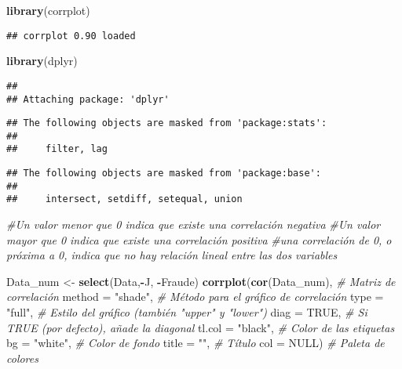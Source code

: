 \documentclass[]{article}
\newenvironment{Shaded}{\begin{snugshade}}{\end{snugshade}}
\newcommand{\CommentTok}[1]{\textcolor[rgb]{0.56,0.35,0.01}{\textit{#1}}}
\newcommand{\DataTypeTok}[1]{\textcolor[rgb]{0.13,0.29,0.53}{#1}}
\newcommand{\KeywordTok}[1]{\textcolor[rgb]{0.13,0.29,0.53}{\textbf{#1}}}
\newcommand{\NormalTok}[1]{#1}
\newcommand{\OperatorTok}[1]{\textcolor[rgb]{0.81,0.36,0.00}{\textbf{#1}}}
\newcommand{\OtherTok}[1]{\textcolor[rgb]{0.56,0.35,0.01}{#1}}
\newcommand{\StringTok}[1]{\textcolor[rgb]{0.31,0.60,0.02}{#1}}
\begin{document}
\begin{Shaded}
\begin{Highlighting}[]
\KeywordTok{library}\NormalTok{(corrplot)}
\end{Highlighting}
\end{Shaded}

\begin{verbatim}
## corrplot 0.90 loaded
\end{verbatim}

\begin{Shaded}
\begin{Highlighting}[]
\KeywordTok{library}\NormalTok{(dplyr)}
\end{Highlighting}
\end{Shaded}

\begin{verbatim}
## 
## Attaching package: 'dplyr'
\end{verbatim}

\begin{verbatim}
## The following objects are masked from 'package:stats':
## 
##     filter, lag
\end{verbatim}

\begin{verbatim}
## The following objects are masked from 'package:base':
## 
##     intersect, setdiff, setequal, union
\end{verbatim}

\begin{Shaded}
\begin{Highlighting}[]
\CommentTok{#Un valor menor que 0 indica que existe una correlación negativa}
\CommentTok{#Un valor mayor que 0 indica que existe una correlación positiva}
\CommentTok{#una correlación de 0, o próxima a 0, indica que no hay relación lineal entre las dos variables}

\NormalTok{Data_num <-}\StringTok{ }\KeywordTok{select}\NormalTok{(Data,}\OperatorTok{-}\NormalTok{J, }\OperatorTok{-}\NormalTok{Fraude)}
\KeywordTok{corrplot}\NormalTok{(}\KeywordTok{cor}\NormalTok{(Data_num),        }\CommentTok{# Matriz de correlación}
         \DataTypeTok{method =} \StringTok{"shade"}\NormalTok{, }\CommentTok{# Método para el gráfico de correlación}
         \DataTypeTok{type =} \StringTok{"full"}\NormalTok{,    }\CommentTok{# Estilo del gráfico (también "upper" y "lower")}
         \DataTypeTok{diag =} \OtherTok{TRUE}\NormalTok{,      }\CommentTok{# Si TRUE (por defecto), añade la diagonal}
         \DataTypeTok{tl.col =} \StringTok{"black"}\NormalTok{, }\CommentTok{# Color de las etiquetas}
         \DataTypeTok{bg =} \StringTok{"white"}\NormalTok{,     }\CommentTok{# Color de fondo}
         \DataTypeTok{title =} \StringTok{""}\NormalTok{,       }\CommentTok{# Título}
         \DataTypeTok{col =} \OtherTok{NULL}\NormalTok{)       }\CommentTok{# Paleta de colores}
\end{Highlighting}
\end{Shaded}
\end{document}
